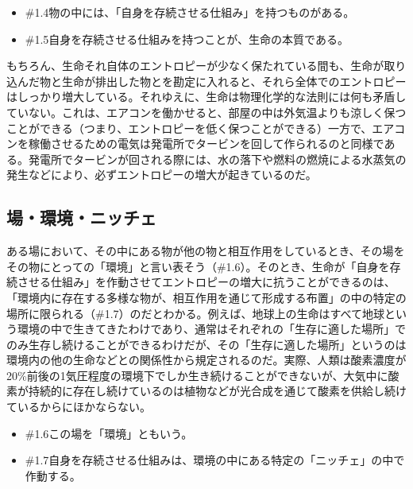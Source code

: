 \begin{note}{}
  \begin{itemize}
    \tightlist
    \item{\#1.4}物の中には、「自身を存続させる仕組み」を持つものがある。
    \item{\#1.5}自身を存続させる仕組みを持つことが、生命の本質である。
  \end{itemize}
\end{note}

もちろん、生命それ自体のエントロピーが少なく保たれている間も、生命が取り込んだ物と生命が排出した物とを勘定に入れると、それら全体でのエントロピーはしっかり増大している。それゆえに、生命は物理化学的な法則には何も矛盾していない。これは、エアコンを働かせると、部屋の中は外気温よりも涼しく保つことができる（つまり、エントロピーを低く保つことができる）一方で、エアコンを稼働させるための電気は発電所でタービンを回して作られるのと同様である。発電所でタービンが回される際には、水の落下や燃料の燃焼による水蒸気の発生などにより、必ずエントロピーの増大が起きているのだ。

\subsection{場・環境・ニッチェ}\label{ux5834ux74b0ux5883ux30cbux30c3ux30c1ux30a7}

ある場において、その中にある物が他の物と相互作用をしているとき、その場をその物にとっての「環境」と言い表そう（\#1.6）。そのとき、生命が「自身を存続させる仕組み」を作動させてエントロピーの増大に抗うことができるのは、「環境内に存在する多様な物が、相互作用を通じて形成する布置」の中の特定の場所に限られる（\#1.7）のだとわかる。例えば、地球上の生命はすべて地球という環境の中で生きてきたわけであり、通常はそれぞれの「生存に適した場所」でのみ生存し続けることができるわけだが、その「生存に適した場所」というのは環境内の他の生命などとの関係性から規定されるのだ。実際、人類は酸素濃度が20\%前後の1気圧程度の環境下でしか生き続けることができないが、大気中に酸素が持続的に存在し続けているのは植物などが光合成を通じて酸素を供給し続けているからにほかならない。

\begin{note}{}
  \begin{itemize}
    \tightlist
    \item{\#1.6}この場を「環境」ともいう。
    \item{\#1.7}自身を存続させる仕組みは、環境の中にある特定の「ニッチェ」の中で作動する。
  \end{itemize}
\end{note}

